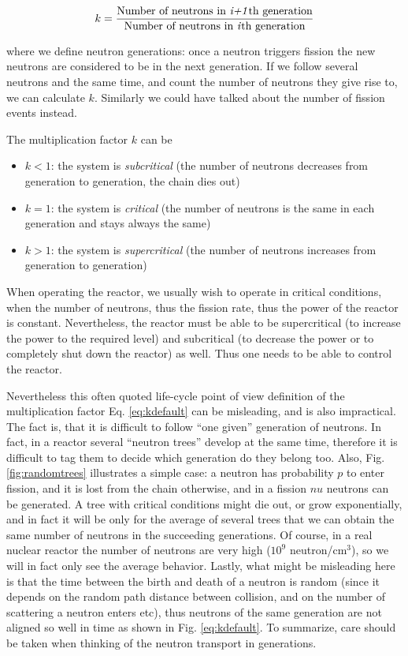 \begin{equation}\label{eq:kdefault}
k=\frac{\text{Number of neutrons in \textit{i+1}th generation}}{\text{Number of neutrons in \textit{i}th generation}}
\end{equation}

where we define neutron generations: once a neutron triggers fission the new neutrons are considered to be in the next generation. If we follow several neutrons and the same time, and count the number of neutrons they give rise to, we can calculate $k$. Similarly we could have talked about the number of fission events instead. 

The multiplication factor $k$ can be

\begin{itemize}
\item $k<1$: the system is \textit{subcritical} (the number of neutrons decreases from generation to generation, the chain dies out)
\item $k=1$: the system is \textit{critical} (the number of neutrons is the same in each generation and stays always the same)
\item $k>1$: the system is \textit{supercritical} (the number of neutrons increases from generation to generation)
\end{itemize}

When operating the reactor, we usually wish to operate in critical conditions, when the number of neutrons, thus the fission rate, thus the power of the reactor is constant. Nevertheless, the reactor must be able to be supercritical (to increase the power to the required level) and subcritical (to decrease the power or to completely shut down the reactor) as well. Thus one needs to be able to control the reactor.

Nevertheless this often quoted life-cycle point of view definition of the multiplication factor Eq. \ref{eq:kdefault} can be misleading, and is also impractical. The fact is, that it is difficult to follow ``one given'' generation of neutrons. In fact, in a reactor several ``neutron trees'' develop at the same time, therefore it is difficult to tag them to decide which generation do they belong too. Also, Fig. \ref{fig:randomtrees} illustrates a simple case: a neutron has probability $p$ to enter fission, and it is lost from the chain otherwise, and in a fission $nu$ neutrons can be generated. A tree with critical conditions might die out, or grow exponentially, and in fact it will be only for the average of several trees that we can obtain the same number of neutrons in the succeeding generations. Of course, in a real nuclear reactor the number of neutrons are very high ($10^9$ neutron/cm$^3$), so we will in fact only see the average behavior. Lastly, what might be misleading here is that the time between the birth and death of a neutron is random (since it depends on the random path distance between collision, and on the number of scattering a neutron enters etc), thus neutrons of the same generation are not aligned so well in time as shown in Fig. \ref{eq:kdefault}. To summarize, care should be taken when thinking of the neutron transport in generations. 

